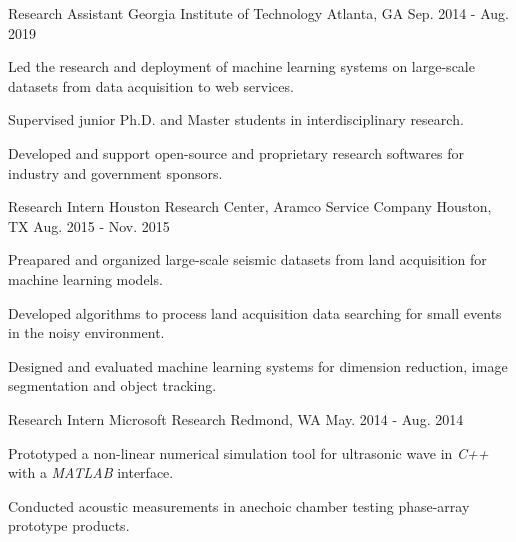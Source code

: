 \begin{cventries}
	\cventry
		{Research Assistant} %
		{Georgia Institute of Technology} %
		{Atlanta, GA} %
		{Sep. 2014 - Aug. 2019} %
		{
			\begin{cvitems} %
				\item {Led the research and deployment of machine learning systems on large-scale datasets from data acquisition to web services.}
				\item {Supervised junior Ph.D. and Master students in interdisciplinary research.}
				\item {Developed and support open-source and proprietary research softwares for industry and government sponsors.}
			\end{cvitems}
		}

	\cventry
		{Research Intern} %
		{Houston Research Center, Aramco Service Company} %
		{Houston, TX} %
		{Aug. 2015 - Nov. 2015} %
		{
			\begin{cvitems} %
				\item {Preapared and organized large-scale seismic datasets from land acquisition for machine learning models.}
				\item {Developed algorithms to process land acquisition data searching for small events in the noisy environment.}
				\item {Designed and evaluated machine learning systems for dimension reduction, image segmentation and object tracking.}
			\end{cvitems}
		}

	\cventry
		{Research Intern} %
		{Microsoft Research} %
		{Redmond, WA} %
		{May. 2014 - Aug. 2014} %
		{
			\begin{cvitems} %
				\item {Prototyped a non-linear numerical simulation tool for ultrasonic wave in \textit{C++} with a \textit{MATLAB} interface.}
				\item {Conducted acoustic measurements in anechoic chamber testing phase-array prototype products.}
			\end{cvitems}
		}


\end{cventries}
